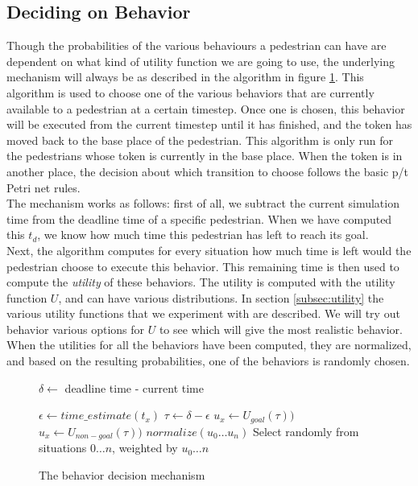 \documentclass[11pt, a4paper]{book}
\begin{document}
\subsection{Deciding on Behavior}
Though the probabilities of the various behaviours a pedestrian can have are dependent on what kind of utility function we are going to use, the underlying mechanism will always be as described in the algorithm in figure \ref{fig:decisionmechanism}. This algorithm is used to choose one of the various behaviors that are currently available to a pedestrian at a certain timestep. Once one is chosen, this behavior will be executed from the current timestep until it has finished, and the token has moved back to the base place of the pedestrian. This algorithm is only run for the pedestrians whose token is currently in the base place. When the token is in another place, the decision about which transition to choose follows the basic p/t Petri net rules.\\
The mechanism works as follows: first of all, we subtract the current simulation time from the deadline time of a specific pedestrian.  When we have computed this $t_d$, we know how much time this pedestrian has left to reach its goal.\\
Next, the algorithm computes for every situation how much time is left would the pedestrian choose to execute this behavior. This remaining time is then used to compute the \emph{utility} of these behaviors. The utility is computed with the utility function $U$, and can have various distributions. In section \ref{subsec:utility} the various utility functions that we experiment with are described. We will try out behavior various options for $U$ to see which will give the most realistic behavior. When the utilities for all the behaviors have been computed, they are normalized, and based on the resulting probabilities, one of the behaviors is randomly chosen.

\begin{figure}
\begin{algorithm}

\begin{algorithmic}
\State $\delta \gets $ deadline time - current time 

\State $\epsilon \gets time\_estimate(t_x)$ 
\State $\tau \gets \delta - \epsilon$
	\State $u_x \gets U_{goal}(\tau))$
\Else
	\State $u_x \gets U_{non-goal}(\tau))$
\EndIf
\EndFor
\State $normalize(u_0 \ldots u_n)$
\State Select randomly from situations $0 \ldots n$, weighted by $u_0 \ldots n$
\end{algorithmic}
\end{algorithm}
\caption{The behavior decision mechanism}
\label{fig:decisionmechanism}
\end{figure}
\end{document}
